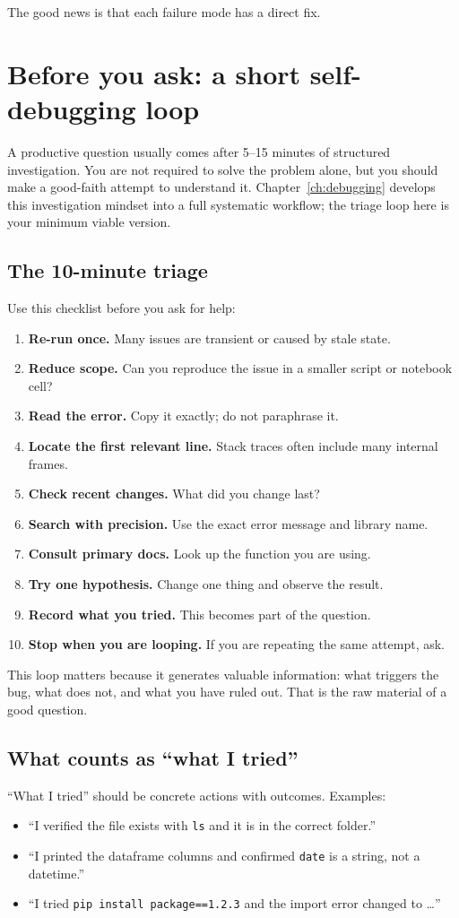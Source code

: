 The good news is that each failure mode has a direct fix.

\section{Before you ask: a short self-debugging loop}
A productive question usually comes after 5--15 minutes of structured investigation. You are not required to solve the problem alone, but you should make a good-faith attempt to understand it. Chapter~\ref{ch:debugging} develops this investigation mindset into a full systematic workflow; the triage loop here is your minimum viable version.

\subsection{The 10-minute triage}
Use this checklist before you ask for help:
\begin{enumerate}[noitemsep]
  \item \textbf{Re-run once.} Many issues are transient or caused by stale state.
  \item \textbf{Reduce scope.} Can you reproduce the issue in a smaller script or notebook cell?
  \item \textbf{Read the error.} Copy it exactly; do not paraphrase it.
  \item \textbf{Locate the first relevant line.} Stack traces often include many internal frames.
  \item \textbf{Check recent changes.} What did you change last?
  \item \textbf{Search with precision.} Use the exact error message and library name.
  \item \textbf{Consult primary docs.} Look up the function you are using.
  \item \textbf{Try one hypothesis.} Change one thing and observe the result.
  \item \textbf{Record what you tried.} This becomes part of the question.
  \item \textbf{Stop when you are looping.} If you are repeating the same attempt, ask.
\end{enumerate}

This loop matters because it generates valuable information: what triggers the bug, what does not, and what you have ruled out. That is the raw material of a good question.

\subsection{What counts as ``what I tried''}
``What I tried'' should be concrete actions with outcomes. Examples:
\begin{itemize}[noitemsep]
  \item ``I verified the file exists with \texttt{ls} and it is in the correct folder.''
  \item ``I printed the dataframe columns and confirmed \texttt{date} is a string, not a datetime.''
  \item ``I tried \texttt{pip install package==1.2.3} and the import error changed to \ldots''
\end{itemize}

